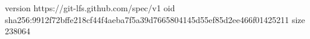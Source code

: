 version https://git-lfs.github.com/spec/v1
oid sha256:9912f72bffe218cf44f4aeba7f5a39d7665804145d55ef85d2ee466f01425211
size 238064
